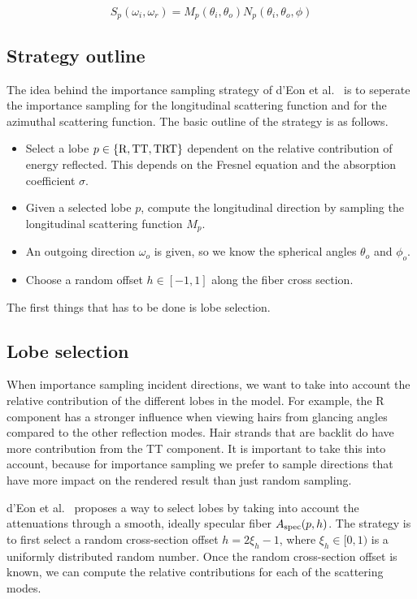 \documentclass[11pt,a4paper]{report}
\begin{document}
\begin{equation}
S_p(\omega_i, \omega_r) = M_p(\theta_i, \theta_o) N_p(\theta_i, \theta_o, \phi)
\end{equation}

\subsection{Strategy outline}

The idea behind the importance sampling strategy of d'Eon et al.~\cite{eon2013} is to seperate the importance sampling for the longitudinal scattering function and for the azimuthal scattering function. The basic outline of the strategy is as follows.

\begin{itemize}
\item Select a lobe $p \in \{ \textnormal{R}, \textnormal{TT}, \textnormal{TRT} \}$ dependent on the relative contribution of energy reflected. This depends on the Fresnel equation and the absorption coefficient $\sigma$.
\item Given a selected lobe $p$, compute the longitudinal direction by sampling the longitudinal scattering function $M_p$.
\item An outgoing direction $\omega_o$ is given, so we know the spherical angles $\theta_o$ and $\phi_o$.
\item Choose a random offset $h \in [-1, 1]$ along the fiber cross section.
\end{itemize}

The first things that has to be done is lobe selection.

\subsection{Lobe selection}
\label{sec_lobe_selection}

When importance sampling incident directions, we want to take into account the relative contribution of the different lobes in the model. For example, the R component has a stronger influence when viewing hairs from glancing angles compared to the other reflection modes. Hair strands that are backlit do have more contribution from the TT component. It is important to take this into account, because for importance sampling we prefer to sample directions that have more impact on the rendered result than just random sampling.

d'Eon et al.~\cite{eon2013} proposes a way to select lobes by taking into account the attenuations through a smooth, ideally specular fiber $A_{\textnormal{spec}}(p, h)$. The strategy is to first select a random cross-section offset $h = 2\xi_h - 1$,  where $\xi_h \in [0, 1)$ is a uniformly distributed random number. Once the random cross-section offset is known, we can compute the relative contributions for each of the scattering modes.
\end{document}
